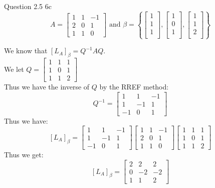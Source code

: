 \documentclass[answers,12pt,addpoints]{exam}
\begin{document}
\begin{questions}
\begin{solution}
    \end{solution}
    \question Question 2.5 6c
    $$A = \begin{bmatrix}
        1 & 1 & -1 \\
        2 & 0 & 1\\
        1 & 1 & 0
    \end{bmatrix} \text{ and } \beta = \left\{ \begin{bmatrix}
        1\\
        1\\
        1\\
    \end{bmatrix}, \begin{bmatrix}
        1\\
        0\\
        1\\
    \end{bmatrix}, \begin{bmatrix}
        1\\
        1\\
        2\\
    \end{bmatrix}\right\}$$
    \begin{solution}
        We know that $[L_A]_{\beta} = Q^{-1} A Q$.\\
        We let $Q = \begin{bmatrix}
            1 & 1 & 1\\
            1 & 0 & 1\\
            1 & 1 & 2
        \end{bmatrix}$\\
        Thus we have the inverse of $Q$ by the RREF method:\\
        $$Q^{-1} = \begin{bmatrix}
            1 & 1 & -1\\
            1 & -1 & 1\\
            -1 & 0 & 1
        \end{bmatrix}$$
        Thus we have:
        $$[L_A]_{\beta} = \begin{bmatrix}
            1 & 1 & -1\\
            1 & -1 & 1\\
            -1 & 0 & 1
        \end{bmatrix} \begin{bmatrix}
            1 & 1 & -1 \\
            2 & 0 & 1\\
            1 & 1 & 0
        \end{bmatrix} \begin{bmatrix}
            1 & 1 & 1\\
            1 & 0 & 1\\
            1 & 1 & 2
        \end{bmatrix}$$
        Thus we get:
        $$[L_A]_{\beta} = \begin{bmatrix}
            2 & 2 & 2\\
            0 & -2 & -2\\
            1 & 1 & 2
        \end{bmatrix} $$


\end{solution}
\end{questions}
\end{document}
